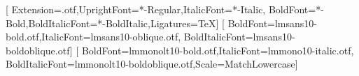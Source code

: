 \usepackage{fontspec}
\setmainfont{STIXTwoText}[
  Extension=.otf,UprightFont=*-Regular,ItalicFont=*-Italic,
  BoldFont=*-Bold,BoldItalicFont=*-BoldItalic,Ligatures=TeX]
\setsansfont{lmsans10-regular.otf}[
  BoldFont=lmsans10-bold.otf,ItalicFont=lmsans10-oblique.otf,
  BoldItalicFont=lmsans10-boldoblique.otf]
\setmonofont{lmmono10-regular.otf}[
  BoldFont=lmmonolt10-bold.otf,ItalicFont=lmmono10-italic.otf,
  BoldItalicFont=lmmonolt10-boldoblique.otf,Scale=MatchLowercase]
\usepackage{amsmath,unicode-math}
\usepackage{cancel,graphicx,adjustbox,newunicodechar,pifont}
\NewCommandCopy{\MarkTwoTeXTabular}{\tabular}
\NewCommandCopy{\EndMarkTwoTeXTabular}{\endtabular}
  {}{}
\providecommand{\diff}{\mathop{}\!\mathrm{d}}
\DeclareMathSizes{12.75bp}{12.75bp}{9bp}{6.75bp}
\newcommand{\MarkTwoTeXBody}{@BODY@}
\newcommand{\MarkTwoTeXMathSpacing}{%
  \setlength{\abovedisplayskip}{9bp}%
  \setlength{\belowdisplayskip}{9bp}%
  \setlength{\abovedisplayshortskip}{5bp}%
  \setlength{\belowdisplayshortskip}{6bp}}
